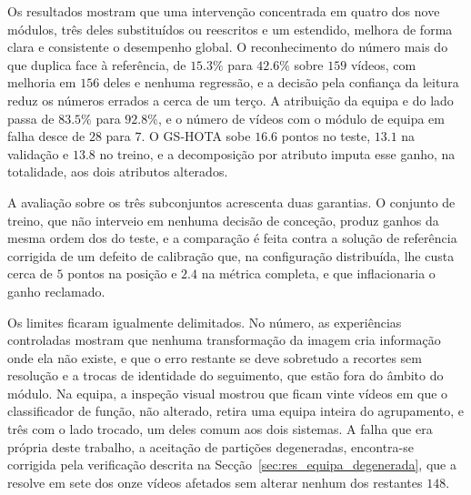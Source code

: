 Os resultados mostram que uma intervenção concentrada em quatro dos nove módulos, três deles substituídos ou reescritos e um estendido, melhora de forma clara e consistente o desempenho global. O reconhecimento do número mais do que duplica face à referência, de $15.3\%$ para $42.6\%$ sobre $159$ vídeos, com melhoria em $156$ deles e nenhuma regressão, e a decisão pela confiança da leitura reduz os números errados a cerca de um terço. A atribuição da equipa e do lado passa de $83.5\%$ para $92.8\%$, e o número de vídeos com o módulo de equipa em falha desce de $28$ para $7$. O GS-HOTA sobe $16.6$ pontos no teste, $13.1$ na validação e $13.8$ no treino, e a decomposição por atributo imputa esse ganho, na totalidade, aos dois atributos alterados.

A avaliação sobre os três subconjuntos acrescenta duas garantias. O conjunto de treino, que não interveio em nenhuma decisão de conceção, produz ganhos da mesma ordem dos do teste, e a comparação é feita contra a solução de referência corrigida de um defeito de calibração que, na configuração distribuída, lhe custa cerca de $5$ pontos na posição e $2.4$ na métrica completa, e que inflacionaria o ganho reclamado.

Os limites ficaram igualmente delimitados. No número, as experiências controladas mostram que nenhuma transformação da imagem cria informação onde ela não existe, e que o erro restante se deve sobretudo a recortes sem resolução e a trocas de identidade do seguimento, que estão fora do âmbito do módulo. Na equipa, a inspeção visual mostrou que ficam vinte vídeos em que o classificador de função, não alterado, retira uma equipa inteira do agrupamento, e três com o lado trocado, um deles comum aos dois sistemas. A falha que era própria deste trabalho, a aceitação de partições degeneradas, encontra-se corrigida pela verificação descrita na Secção~\ref{sec:res_equipa_degenerada}, que a resolve em sete dos onze vídeos afetados sem alterar nenhum dos restantes $148$.
